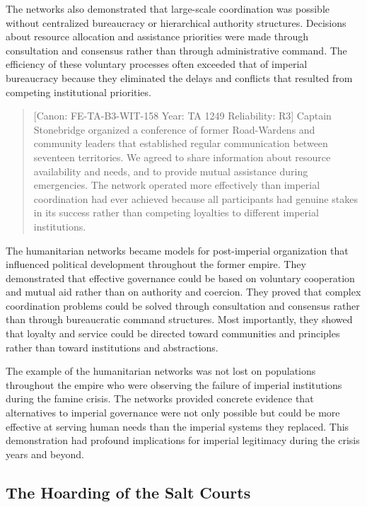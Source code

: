 The networks also demonstrated that large-scale coordination was
possible without centralized bureaucracy or hierarchical authority
structures. Decisions about resource allocation and assistance
priorities were made through consultation and consensus rather than
through administrative command. The efficiency of these voluntary
processes often exceeded that of imperial bureaucracy because they
eliminated the delays and conflicts that resulted from competing
institutional priorities.

\begin{quote}
{[}Canon: FE-TA-B3-WIT-158 \textbar{} Year: TA 1249 \textbar{}
Reliability: R3{]} Captain Stonebridge organized a conference of former
Road-Wardens and community leaders that established regular
communication between seventeen territories. We agreed to share
information about resource availability and needs, and to provide mutual
assistance during emergencies. The network operated more effectively
than imperial coordination had ever achieved because all participants
had genuine stakes in its success rather than competing loyalties to
different imperial institutions.
\end{quote}

The humanitarian networks became models for post-imperial organization
that influenced political development throughout the former empire. They
demonstrated that effective governance could be based on voluntary
cooperation and mutual aid rather than on authority and coercion. They
proved that complex coordination problems could be solved through
consultation and consensus rather than through bureaucratic command
structures. Most importantly, they showed that loyalty and service could
be directed toward communities and principles rather than toward
institutions and abstractions.

The example of the humanitarian networks was not lost on populations
throughout the empire who were observing the failure of imperial
institutions during the famine crisis. The networks provided concrete
evidence that alternatives to imperial governance were not only possible
but could be more effective at serving human needs than the imperial
systems they replaced. This demonstration had profound implications for
imperial legitimacy during the crisis years and beyond.

\subsection{The Hoarding of the Salt
Courts}\label{the-hoarding-of-the-salt-courts}

